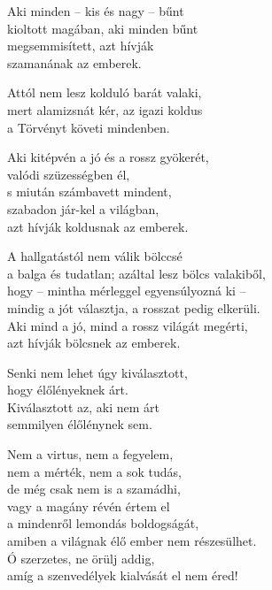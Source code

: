 \begin{dhpverse}

 Aki minden – kis és nagy – bűnt\\
kioltott magában, aki minden bűnt\\
megsemmisített, azt hívják\\
szamanának az emberek.

 Attól nem lesz kolduló barát valaki,\\
mert alamizsnát kér, az igazi koldus\\
a Törvényt követi mindenben.

 Aki kitépvén a jó és a rossz gyökerét,\\
valódi szüzességben él,\\
s miután számbavett mindent,\\
szabadon jár-kel a világban,\\
azt hívják koldusnak az emberek.

 A hallgatástól nem válik bölccsé\\
a balga és tudatlan; azáltal lesz bölcs valakiből,\\
hogy – mintha mérleggel egyensúlyozná ki –\\
mindig a jót választja, a rosszat pedig elkerüli.\\
Aki mind a jó, mind a rossz világát megérti,\\
azt hívják bölcsnek az emberek.

 Senki nem lehet úgy kiválasztott,\\
hogy élőlényeknek árt.\\
Kiválasztott az, aki nem árt\\
semmilyen élőlénynek sem.

\end{dhpverse}
\newpage
\begin{dhpverse}

 Nem a virtus, nem a fegyelem,\\
nem a mérték, nem a sok tudás,\\
de még csak nem is a szamádhi,\\
vagy a magány révén értem el\\
a mindenről lemondás boldogságát,\\
amiben a világnak élő ember nem részesülhet.\\
Ó szerzetes, ne örülj addig,\\
amíg a szenvedélyek kialvását el nem éred!

\end{dhpverse}
